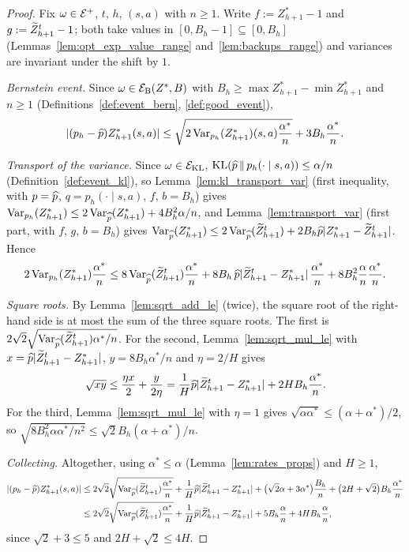 \begin{proof}
\leanok
Fix $\omega \in \mathcal{E}^+$, $t$, $h$, $(s,a)$ with $n \ge 1$. Write $f := Z^*_{h+1} - 1$ and
$g := \widetilde{Z}^t_{h+1} - 1$; both take values in $[0, B_h - 1] \subseteq [0, B_h]$
(Lemmas~\ref{lem:opt_exp_value_range} and~\ref{lem:backups_range}) and variances are invariant
under the shift by $1$.

\emph{Bernstein event.} Since $\omega \in \mathcal{E}_{\mathrm{B}}(Z^*, B)$ with $B_h \ge \max Z^*_{h+1} - \min Z^*_{h+1}$
and $n \ge 1$ (Definitions~\ref{def:event_bern}, \ref{def:good_event}),
\[
  \lvert (p_h - \widehat{p}) Z^*_{h+1}(s,a) \rvert
  \le \sqrt{2 \operatorname{Var}_{p_h}(Z^*_{h+1})(s,a) \frac{\alpha^*}{n}} + 3 B_h \frac{\alpha^*}{n} .
\]

\emph{Transport of the variance.} Since $\omega \in \mathcal{E}_{\mathrm{KL}}$, $\mathrm{KL}(\widehat{p} \,\|\, p_h(\cdot \mid s,a)) \le \alpha/n$
(Definition~\ref{def:event_kl}), so Lemma~\ref{lem:kl_transport_var} (first inequality, with
$p = \widehat{p}$, $q = p_h(\cdot \mid s,a)$, $f$, $b = B_h$) gives
$\operatorname{Var}_{p_h}(Z^*_{h+1}) \le 2 \operatorname{Var}_{\widehat{p}}(Z^*_{h+1}) + 4 B_h^2 \alpha/n$, and
Lemma~\ref{lem:transport_var} (first part, with $f$, $g$, $b = B_h$) gives
$\operatorname{Var}_{\widehat{p}}(Z^*_{h+1}) \le 2\operatorname{Var}_{\widehat{p}}(\widetilde{Z}^t_{h+1}) + 2 B_h \widehat{p}\lvert Z^*_{h+1} - \widetilde{Z}^t_{h+1} \rvert$.
Hence
\[
  2 \operatorname{Var}_{p_h}(Z^*_{h+1}) \frac{\alpha^*}{n}
  \le 8 \operatorname{Var}_{\widehat{p}}(\widetilde{Z}^t_{h+1}) \frac{\alpha^*}{n}
  + 8 B_h \, \widehat{p}\lvert \widetilde{Z}^t_{h+1} - Z^*_{h+1} \rvert \, \frac{\alpha^*}{n}
  + 8 B_h^2 \frac{\alpha}{n}\frac{\alpha^*}{n} .
\]

\emph{Square roots.} By Lemma~\ref{lem:sqrt_add_le} (twice), the square root of the right-hand
side is at most the sum of the three square roots. The first is
$2\sqrt2\sqrt{\operatorname{Var}_{\widehat{p}}(\widetilde{Z}^t_{h+1})\alpha^*/n}$. For the second, Lemma~\ref{lem:sqrt_mul_le}
with $x = \widehat{p}\lvert \widetilde{Z}^t_{h+1} - Z^*_{h+1} \rvert$, $y = 8 B_h \alpha^*/n$ and $\eta = 2/H$ gives
\[
  \sqrt{x y} \le \frac{\eta x}{2} + \frac{y}{2\eta}
  = \frac1H \widehat{p}\lvert \widetilde{Z}^t_{h+1} - Z^*_{h+1} \rvert + 2 H B_h \frac{\alpha^*}{n} .
\]
For the third, Lemma~\ref{lem:sqrt_mul_le} with $\eta = 1$ gives
$\sqrt{\alpha \alpha^*} \le (\alpha + \alpha^*)/2$, so
$\sqrt{8 B_h^2 \alpha\alpha^*/n^2} \le \sqrt2 B_h (\alpha + \alpha^*)/n$.

\emph{Collecting.} Altogether, using $\alpha^* \le \alpha$ (Lemma~\ref{lem:rates_props}) and
$H \ge 1$,
\begin{align*}
  \lvert (p_h - \widehat{p}) Z^*_{h+1}(s,a) \rvert
  &\le 2\sqrt2\sqrt{\operatorname{Var}_{\widehat{p}}(\widetilde{Z}^t_{h+1})\frac{\alpha^*}{n}}
     + \frac1H \widehat{p}\lvert \widetilde{Z}^t_{h+1} - Z^*_{h+1} \rvert
     + \big(\sqrt2 \alpha + 3 \alpha^*\big)\frac{B_h}{n}
     + \big(2H + \sqrt2\big) B_h \frac{\alpha^*}{n} \\
  &\le 2\sqrt2\sqrt{\operatorname{Var}_{\widehat{p}}(\widetilde{Z}^t_{h+1})\frac{\alpha^*}{n}}
     + \frac1H \widehat{p}\lvert \widetilde{Z}^t_{h+1} - Z^*_{h+1} \rvert
     + 5 B_h \frac{\alpha}{n} + 4 H B_h \frac{\alpha}{n},
\end{align*}
since $\sqrt2 + 3 \le 5$ and $2H + \sqrt2 \le 4H$.
\end{proof}

